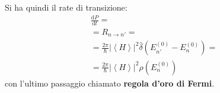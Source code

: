 Si ha quindi il rate di transizione:
\begin{equation}\begin{split}
\frac{\textrm{d}P}{\textrm{d}t}=\\
=R_{n\to n'}=\\
=\frac{2\pi}{\hbar }\left|\left\langle H \right\rangle\right|^2\hat\delta\left(E _{n'}^{\left(0\right)}-E _n^{\left(0\right)}\right)=\\
=\frac{2\pi}{\hbar }\left|\left\langle H \right\rangle\right|^2\rho\left(E_n^{\left(0\right)}\right)
\end{split}\end{equation}
con l'ultimo passaggio chiamato \textbf{regola d'oro di Fermi}.